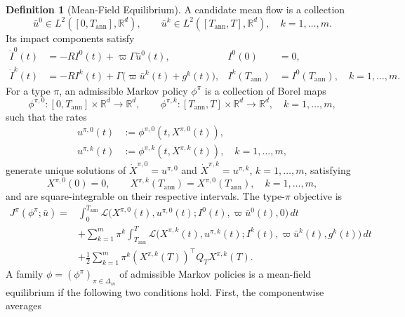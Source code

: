 \documentclass[12pt]{article}
\numberwithin{equation}{section}
\theoremstyle{definition}
\newtheorem{definition}[theorem]{Definition}
\begin{document}
\begin{definition}[Mean-Field Equilibrium]\label{def:mf_equilibrium}
A candidate mean flow is a collection
\[
\bar u^0\in L^2([0,T_{\mathrm{ann}}],\mathbb R^d),
\qquad
\bar u^k\in L^2([T_{\mathrm{ann}},T],\mathbb R^d),
\quad k=1,\ldots,m.
\]
Its impact components satisfy
\begin{equation}\label{eq:mf_component_impact_dynamics}
\begin{aligned}
\dot I^0(t)
&=-RI^0(t)+\varpi\Gamma\bar u^0(t),
& I^0(0)&=0,
\\
\dot I^k(t)
&=-RI^k(t)+\Gamma\bigl(\varpi\bar u^k(t)+g^k(t)\bigr),
& I^k(T_{\mathrm{ann}})&=I^0(T_{\mathrm{ann}}),
\quad k=1,\ldots,m.
\end{aligned}
\end{equation}
For a type \(\pi\), an admissible Markov policy \(\phi^\pi\) is a collection of
Borel maps
\[
\phi^{\pi,0}:[0,T_{\mathrm{ann}}]\times\mathbb R^d\longrightarrow\mathbb R^d,
\qquad
\phi^{\pi,k}:[T_{\mathrm{ann}},T]\times\mathbb R^d\longrightarrow\mathbb R^d,
\quad k=1,\ldots,m,
\]
such that the rates
\[
\begin{aligned}
u^{\pi,0}(t)&:=\phi^{\pi,0}(t,X^{\pi,0}(t)),\\
u^{\pi,k}(t)&:=\phi^{\pi,k}(t,X^{\pi,k}(t)),
\quad k=1,\ldots,m,
\end{aligned}
\]
generate unique solutions of
\(\dot X^{\pi,0}=u^{\pi,0}\) and
\(\dot X^{\pi,k}=u^{\pi,k}\), \(k=1,\ldots,m\), satisfying
\[
X^{\pi,0}(0)=0,
\qquad
X^{\pi,k}(T_{\mathrm{ann}})=X^{\pi,0}(T_{\mathrm{ann}}),
\quad k=1,\ldots,m,
\]
and are square-integrable on their respective intervals. The type-\(\pi\)
objective is
\begin{equation}\label{eq:mf_type_objective}
\begin{aligned}
J^\pi(\phi^\pi;\bar u)
={}&
\int_0^{T_{\mathrm{ann}}}
\mathcal L\bigl(
X^{\pi,0}(t),u^{\pi,0}(t);
I^0(t),\varpi\bar u^0(t),0
\bigr)\,dt
\\
&+
\sum_{k=1}^m\pi^k
\int_{T_{\mathrm{ann}}}^T
\mathcal L\bigl(
X^{\pi,k}(t),u^{\pi,k}(t);
I^k(t),\varpi\bar u^k(t),g^k(t)
\bigr)\,dt
\\
&+
\frac{1}{2}\sum_{k=1}^m\pi^k
(X^{\pi,k}(T))^\top Q_T X^{\pi,k}(T).
\end{aligned}
\end{equation}
A family \(\phi=(\phi^{\pi})_{\pi\in\Delta_m}\) of admissible Markov
policies is a mean-field equilibrium if the following two conditions hold.
First, the componentwise averages
\begin{equation}\label{eq:mf_average_consistency}

\end{equation}
\end{definition}
\end{document}
